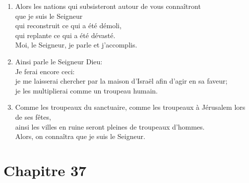 \documentclass[12pt,a4paper,titlepage]{article}
\def \pslabelsep{0.2em} %
\def \psleftmargin{0em} %
\begin{document}
\begin{enumerate}[leftmargin=\psleftmargin, labelsep = \pslabelsep, label={\arabic*}, font=\color{\pscolor}\small\textsuperscript, parsep=0em, itemsep=0em, topsep=0em ]
\item Alors les nations qui subsisteront autour de vous connaîtront \\ que je suis le Seigneur \\ \decalage qui reconstruit ce qui a été démoli, \\ \decalage qui replante ce qui a été dévasté. \\ Moi, le Seigneur, je parle et j’accomplis. \parSpace
\item  Ainsi parle le Seigneur Dieu: \\ Je ferai encore ceci: \\ je me laisserai chercher par la maison d’Israël afin d’agir en sa faveur; \\ je les multiplierai comme un troupeau humain.
\item Comme les troupeaux du sanctuaire, comme les troupeaux à Jérusalem lors de ses fêtes, \\ ainsi les villes en ruine seront pleines de troupeaux d’hommes. \\ Alors, on connaîtra que je suis le Seigneur.
\end{enumerate}
\newpage

\section*{Chapitre 37}
\end{document}
